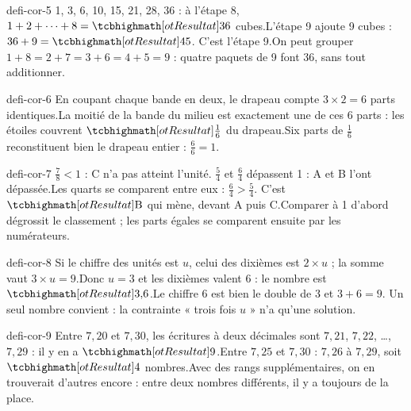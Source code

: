 \begin{blocEdition}{defi-cor-5}
1, 3, 6, 10, 15, 21, 28, 36 : à l’étape 8, $1+2+\cdots+8=\res{36}$ cubes.L’étape 9 ajoute 9 cubes : $36+9=\res{45}$. C’est l’étape 9.On peut grouper $1+8=2+7=3+6=4+5=9$ : quatre paquets de 9 font 36, sans tout additionner.
\end{blocEdition}
\begin{blocEdition}{defi-cor-6}
En coupant chaque bande en deux, le drapeau compte $3\times2=6$ parts identiques.La moitié de la bande du milieu est exactement une de ces 6 parts : les étoiles couvrent $\res{\frac16}$ du drapeau.Six parts de $\frac16$ reconstituent bien le drapeau entier : $\frac66=1$.
\end{blocEdition}
\begin{blocEdition}{defi-cor-7}
$\frac78<1$ : C n’a pas atteint l’unité. $\frac54$ et $\frac64$ dépassent 1 : A et B l’ont dépassée.Les quarts se comparent entre eux : $\frac64>\frac54$. C’est $\res{\text{B}}$ qui mène, devant A puis C.Comparer à 1 d’abord dégrossit le classement ; les parts égales se comparent ensuite par les numérateurs.
\end{blocEdition}
\begin{blocEdition}{defi-cor-8}
Si le chiffre des unités est $u$, celui des dixièmes est $2\times u$ ; la somme vaut $3\times u=9$.Donc $u=3$ et les dixièmes valent 6 : le nombre est $\res{3{,}6}$.Le chiffre 6 est bien le double de 3 et $3+6=9$. Un seul nombre convient : la contrainte « trois fois $u$ » n’a qu’une solution.
\end{blocEdition}
\begin{blocEdition}{defi-cor-9}
Entre $7{,}20$ et $7{,}30$, les écritures à deux décimales sont $7{,}21$, $7{,}22$, …, $7{,}29$ : il y en a $\res9$.Entre $7{,}25$ et $7{,}30$ : $7{,}26$ à $7{,}29$, soit $\res4$ nombres.Avec des rangs supplémentaires, on en trouverait d’autres encore : entre deux nombres différents, il y a toujours de la place.
\end{blocEdition}
